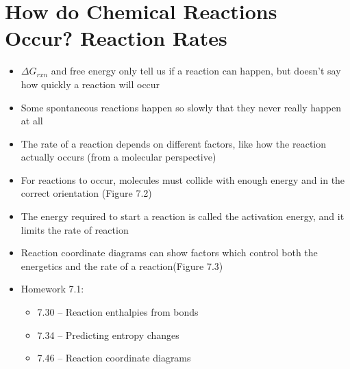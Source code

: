 \documentclass[12pt, openany, letterpaper]{memoir}
\begin{document}
\section{How do Chemical Reactions Occur? Reaction Rates}
\begin{itemize}
	\item $\Delta G_{rxn}$ and free energy only tell us if a reaction can happen, but doesn't say how quickly a reaction will occur
	\item Some spontaneous reactions happen so slowly that they never really happen at all
	\item The rate of a reaction depends on different factors, like how the reaction actually occurs (from a molecular perspective)
	\item For reactions to occur, molecules must collide with enough energy and in the correct orientation (Figure 7.2)
	\item The energy required to start a reaction is called the activation energy, and it limits the rate of reaction
	\item Reaction coordinate diagrams can show factors which control both the energetics and the rate of a reaction(Figure 7.3)
	\item Homework 7.1:
	      \begin{itemize}
		      \item 7.30 -- Reaction enthalpies from bonds
		      \item 7.34 -- Predicting entropy changes
		      \item 7.46 -- Reaction coordinate diagrams
	      \end{itemize}
\end{itemize}
\end{document}
